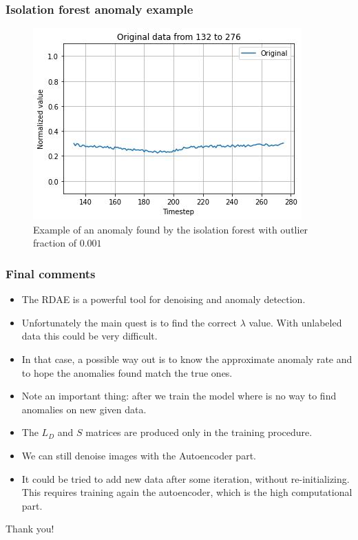 \documentclass{beamer}
\theoremstyle{plain}
\theoremstyle{definition}
\theoremstyle{remark}
\begin{document}
\begin{frame}
	\frametitle{Isolation forest anomaly example}
	\begin{figure}
		\centering
		\includegraphics[width=0.7\linewidth]{Images/anom_if0.001pos132.jpg}
		\caption[]{Example of an anomaly found by the isolation forest with outlier fraction of $0.001$}
	\end{figure}
\end{frame}

\begin{frame}
	\frametitle{Final comments}
	\begin{itemize}
		\item The RDAE is a powerful tool for denoising and anomaly detection.
		\item Unfortunately the main quest is to find the correct $\lambda$ value. With unlabeled data this could be very difficult.
		\item In that case, a possible way out is to know the approximate anomaly rate and to hope the anomalies found match the true ones.
	\end{itemize}
\end{frame}

\begin{frame}
	\begin{itemize}
		\item Note an important thing: after we train the model where is no way to find anomalies on new given data.
		\item The $L_D$ and $S$ matrices are produced only in the training procedure.
		\item We can still denoise images with the Autoencoder part.
		\item It could be tried to add new data after some iteration, without re-initializing. This requires training again the autoencoder, which is the high computational part.
	\end{itemize}
\end{frame}

\begin{frame}
	\Huge{\centerline{Thank you!}} 
\end{frame}

\nocite{RAE}
\nocite{DATA}
\nocite{RPCA}
\nocite{PROX}






\end{document}
